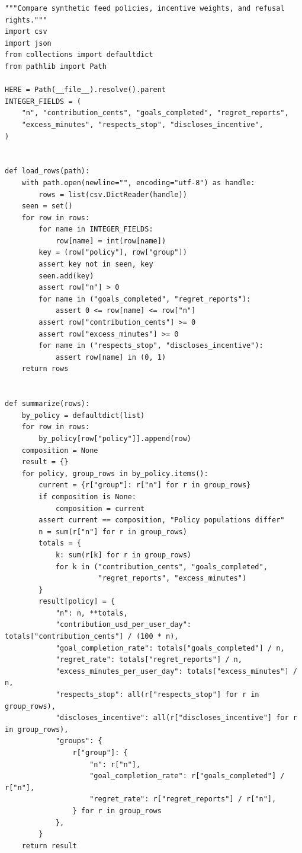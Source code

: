 \begin{Verbatim}[breaklines,breakanywhere,fontsize=\small]
"""Compare synthetic feed policies, incentive weights, and refusal rights."""
import csv
import json
from collections import defaultdict
from pathlib import Path

HERE = Path(__file__).resolve().parent
INTEGER_FIELDS = (
    "n", "contribution_cents", "goals_completed", "regret_reports",
    "excess_minutes", "respects_stop", "discloses_incentive",
)


def load_rows(path):
    with path.open(newline="", encoding="utf-8") as handle:
        rows = list(csv.DictReader(handle))
    seen = set()
    for row in rows:
        for name in INTEGER_FIELDS:
            row[name] = int(row[name])
        key = (row["policy"], row["group"])
        assert key not in seen, key
        seen.add(key)
        assert row["n"] > 0
        for name in ("goals_completed", "regret_reports"):
            assert 0 <= row[name] <= row["n"]
        assert row["contribution_cents"] >= 0
        assert row["excess_minutes"] >= 0
        for name in ("respects_stop", "discloses_incentive"):
            assert row[name] in (0, 1)
    return rows


def summarize(rows):
    by_policy = defaultdict(list)
    for row in rows:
        by_policy[row["policy"]].append(row)
    composition = None
    result = {}
    for policy, group_rows in by_policy.items():
        current = {r["group"]: r["n"] for r in group_rows}
        if composition is None:
            composition = current
        assert current == composition, "Policy populations differ"
        n = sum(r["n"] for r in group_rows)
        totals = {
            k: sum(r[k] for r in group_rows)
            for k in ("contribution_cents", "goals_completed",
                      "regret_reports", "excess_minutes")
        }
        result[policy] = {
            "n": n, **totals,
            "contribution_usd_per_user_day": totals["contribution_cents"] / (100 * n),
            "goal_completion_rate": totals["goals_completed"] / n,
            "regret_rate": totals["regret_reports"] / n,
            "excess_minutes_per_user_day": totals["excess_minutes"] / n,
            "respects_stop": all(r["respects_stop"] for r in group_rows),
            "discloses_incentive": all(r["discloses_incentive"] for r in group_rows),
            "groups": {
                r["group"]: {
                    "n": r["n"],
                    "goal_completion_rate": r["goals_completed"] / r["n"],
                    "regret_rate": r["regret_reports"] / r["n"],
                } for r in group_rows
            },
        }
    return result



\end{Verbatim}
